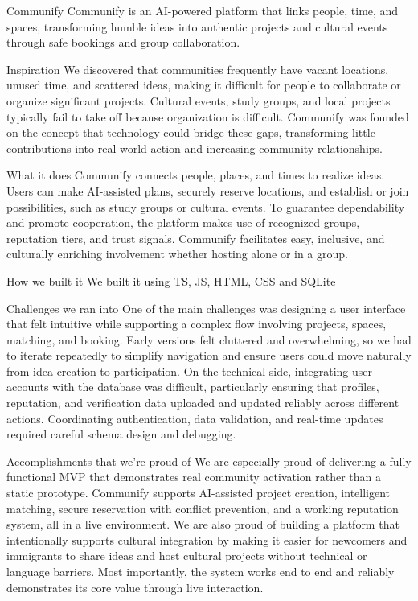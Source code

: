Communify
Communify is an AI-powered platform that links people, time, and spaces, transforming humble ideas into authentic projects and cultural events through safe bookings and group collaboration.

Inspiration
We discovered that communities frequently have vacant locations, unused time, and scattered ideas, making it difficult for people to collaborate or organize significant projects. Cultural events, study groups, and local projects typically fail to take off because organization is difficult. Communify was founded on the concept that technology could bridge these gaps, transforming little contributions into real-world action and increasing community relationships.

What it does
Communify connects people, places, and times to realize ideas. Users can make AI-assisted plans, securely reserve locations, and establish or join possibilities, such as study groups or cultural events. To guarantee dependability and promote cooperation, the platform makes use of recognized groups, reputation tiers, and trust signals. Communify facilitates easy, inclusive, and culturally enriching involvement whether hosting alone or in a group.

How we built it
We built it using TS, JS, HTML, CSS and SQLite

Challenges we ran into
One of the main challenges was designing a user interface that felt intuitive while supporting a complex flow involving projects, spaces, matching, and booking. Early versions felt cluttered and overwhelming, so we had to iterate repeatedly to simplify navigation and ensure users could move naturally from idea creation to participation. On the technical side, integrating user accounts with the database was difficult, particularly ensuring that profiles, reputation, and verification data uploaded and updated reliably across different actions. Coordinating authentication, data validation, and real-time updates required careful schema design and debugging.

Accomplishments that we're proud of
We are especially proud of delivering a fully functional MVP that demonstrates real community activation rather than a static prototype. Communify supports AI-assisted project creation, intelligent matching, secure reservation with conflict prevention, and a working reputation system, all in a live environment. We are also proud of building a platform that intentionally supports cultural integration by making it easier for newcomers and immigrants to share ideas and host cultural projects without technical or language barriers. Most importantly, the system works end to end and reliably demonstrates its core value through live interaction.

